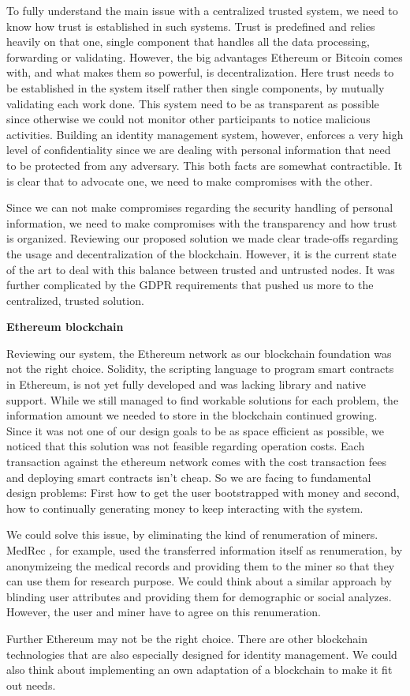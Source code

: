 \noindent To fully understand the main issue with a centralized trusted system, we need to know how trust is established in such systems. Trust is predefined and relies heavily on that one, single component that handles all the data processing, forwarding or validating. However, the big advantages Ethereum or Bitcoin comes with, and what makes them so powerful, is decentralization.  Here trust needs to be established in the system itself rather then single components, by mutually validating each work done.  This system need to be as transparent as possible since otherwise we could not monitor other participants to notice malicious activities. Building an identity management system, however, enforces a very high level of confidentiality since we are dealing with personal information that need to be protected from any adversary. This both facts are somewhat contractible. It is clear that to advocate one, we need to make compromises with the other. 

Since we can not make compromises regarding the security handling of personal information, we need to make compromises with the transparency and how trust is organized. Reviewing our proposed solution we made clear trade-offs regarding the usage and decentralization of the blockchain. However, it is the current state of the art to deal with this balance between trusted and untrusted nodes. It was further complicated by the GDPR requirements that pushed us more to the centralized, trusted solution. 

\textbf{Ethereum blockchain}

\noindent Reviewing our system, the Ethereum network as our blockchain foundation was not the right choice. Solidity, the scripting language to program smart contracts in Ethereum, is not yet fully developed and was lacking library and native support. While we still managed to find workable solutions for each problem, the information amount we needed to store in the blockchain continued growing. Since it was not one of our design goals to be as space efficient as possible, we noticed that this solution was not feasible regarding operation costs. Each transaction against the ethereum network comes with the cost transaction fees and deploying smart contracts isn’t cheap. So we are facing to fundamental design problems: First how to get the user bootstrapped with money and second, how to continually generating money to keep interacting with the system.

We could solve this issue, by eliminating the kind of renumeration of miners. MedRec \cite{azaria2016medrec}, for example, used the transferred information itself as renumeration, by anonymizeing the medical records and providing them to the miner so that they can use them for research purpose. We could think about a similar approach by blinding user attributes and providing them for demographic or social analyzes. However, the user and miner have to agree on this renumeration. 

Further Ethereum may not be the right choice. There are other blockchain technologies that are also especially designed for identity management. We could also think about implementing an own adaptation of a blockchain to make it fit out needs. 

